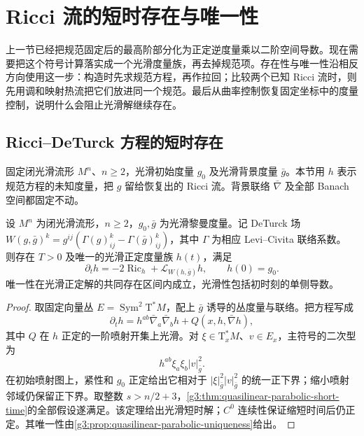 
% 
% 

\section{Ricci 流的短时存在与唯一性}
\label{g3:sec:2702}

上一节已经把规范固定后的最高阶部分化为正定逆度量乘以二阶空间导数。现在需要把这个符号计算落实成一个光滑度量族，再去掉规范项。存在性与唯一性沿相反方向使用这一步：构造时先求规范方程，再作拉回；比较两个已知 Ricci 流时，则先用调和映射热流把它们放进同一个规范。最后从曲率控制恢复固定坐标中的度量控制，说明什么会阻止光滑解继续存在。

\subsection{Ricci–DeTurck 方程的短时存在}
\label{g3:subsec:2702:01}
固定闭光滑流形 \(M^n\)、\(n\ge2\)，光滑初始度量 \(g_0\) 及光滑背景度量 \(\bar g\)。本节用 \(h\) 表示规范方程的未知度量，把 \(g\) 留给恢复出的 Ricci 流。背景联络 \(\bar\nabla\) 及全部 Banach 空间都固定不动。

\begin{proposition}\label{g3:prop:ricci-deturck-short-time}
	设 \(M^n\) 为闭光滑流形，\(n\ge2\)，\(g_0,\bar g\) 为光滑黎曼度量。记 DeTurck 场 \(W(g,\bar g)^k=g^{ij}(\Gamma(g)^k_{ij}-\Gamma(\bar g)^k_{ij})\)，其中 \(\Gamma\) 为相应 Levi--Civita 联络系数。
 则存在 \(T>0\) 及唯一的光滑正定度量族 \(h(t)\)，满足
 \[
  \partial_th=-2\operatorname{Ric}_h+\mathcal L_{W(h,\bar g)}h,
  \qquad h(0)=g_0.
 \]
 唯一性在光滑正定解的共同存在区间内成立，光滑性包括初时刻的单侧导数。
\end{proposition}
\begin{proof}
 取固定向量丛 \(E=\operatorname{Sym}^2\mathrm T^*M\)，配上 \(\bar g\) 诱导的丛度量与联络。把方程写成
 \[
  \partial_th=h^{ab}\bar\nabla_a\bar\nabla_bh
       +Q(x,h,\bar\nabla h),
 \]
 其中 \(Q\) 在 \(h\) 正定的一阶喷射开集上光滑。对 \(\xi\in\mathrm T_x^*M\)、\(v\in E_x\)，主符号的二次型为
 \[
  h^{ab}\xi_a\xi_b|v|_{\bar g}^2.
 \]
 在初始喷射图上，紧性和 \(g_0\) 正定给出它相对于 \(|\xi|_{\bar g}^2|v|_{\bar g}^2\) 的统一正下界；缩小喷射邻域仍保留正下界。取整数 \(s>n/2+3\)，\cref{g3:thm:quasilinear-parabolic-short-time}的全部假设遂满足。该定理给出光滑短时解；\(C^0\) 连续性保证缩短时间后仍正定。其唯一性由\cref{g3:prop:quasilinear-parabolic-uniqueness}给出。
\end{proof}

